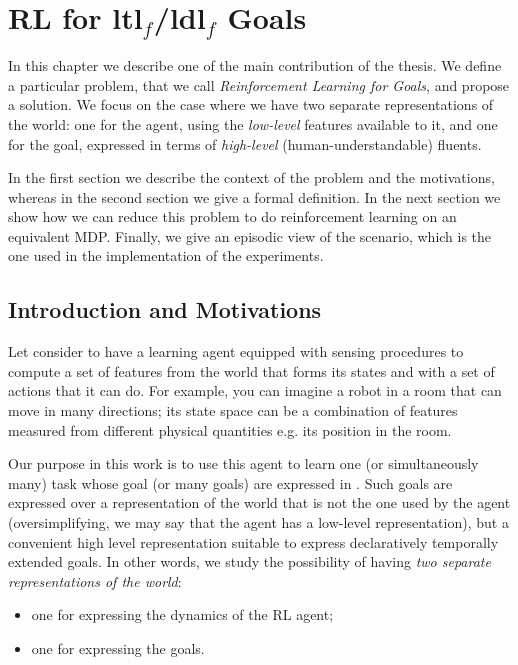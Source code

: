 \chapter{RL for {\sc ltl}$_f$/{\sc ldl}$_f$ Goals}\label{ch:rl-llf-goals}

In this chapter we describe one of the main contribution of the thesis. We define a particular problem, that we call
\emph{Reinforcement Learning for \LLf Goals}, and propose a solution.
We focus on the case where we have two separate representations of the world: one for the agent, using the \emph{low-level} features available to it, and one for the goal, expressed in terms of \emph{high-level} (human-understandable) fluents.

In the first section we describe the context of the problem and the motivations, whereas in the second section we give a formal definition. In the next section we show how we can reduce this problem to do reinforcement learning on an equivalent MDP. Finally, we give an episodic view of the scenario, which is the one used in the implementation of the experiments.

\section{Introduction and Motivations}
Let consider to have a
learning agent equipped with sensing procedures to compute
a set of features from the world that forms its states and with
a set of actions that it can do. 
For example, you can imagine a robot in a room that can move in many directions; its state space can be a combination of features measured from different physical quantities e.g. its position in the room.

Our purpose in this work is to use this agent
to learn one (or simultaneously many) task whose goal (or many goals)
are expressed in \LLf. Such goals are expressed over
a representation of the world that is not the one used by the
agent (oversimplifying, we may say that the agent has a low-level representation), but a convenient high level representation suitable to express declaratively temporally extended goals. In other words, we study the possibility of having \emph{two
separate representations of the world}:
\begin{itemize}
	\item one for expressing the dynamics of the RL agent;
	\item one for expressing the \LLf goals.
\end{itemize}

